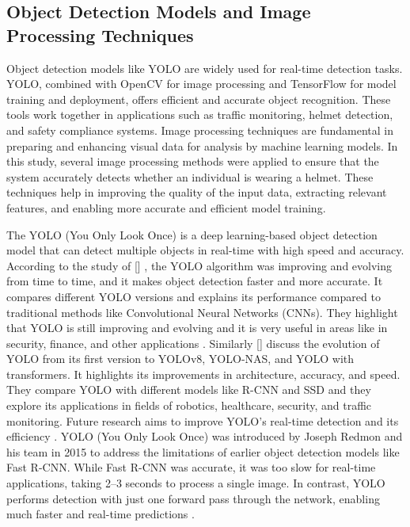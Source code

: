 \begin{refsection}
\subsection{Object Detection Models and Image Processing Techniques}

    Object detection models like YOLO are widely used for real-time detection tasks. YOLO, combined with OpenCV for image processing and TensorFlow for model training and deployment, offers efficient and accurate object recognition. These tools work together in applications such as traffic monitoring, helmet detection, and safety compliance systems.  Image processing techniques are fundamental in preparing and enhancing visual data for analysis by machine learning models. In this study, several image processing methods were applied to ensure that the system accurately detects whether an individual is wearing a helmet. These techniques help in improving the quality of the input data, extracting relevant features, and enabling more accurate and efficient model training.

The YOLO (You Only Look Once) is a deep learning-based object detection model that can detect multiple objects in real-time with high speed and accuracy. According to the study of \citeauthor{jiang2022review} [\citeyear{jiang2022review}] , the YOLO algorithm was improving and evolving from time to time, and it makes object detection faster and more accurate. It compares different YOLO versions and explains its performance compared to traditional methods like Convolutional Neural Networks (CNNs). They highlight that YOLO is still improving and evolving and it is very useful in areas like in security, finance, and other applications \cite{jiang2022review}. Similarly \citeauthor{terven2022comprehensive} [\citeyear{terven2022comprehensive}] discuss the evolution of YOLO from its first version to YOLOv8, YOLO-NAS, and YOLO with transformers. It highlights its improvements in architecture, accuracy, and speed. They compare YOLO with different models like R-CNN and SSD and they explore its applications in fields of robotics, healthcare, security, and traffic monitoring. Future research aims to improve YOLO’s real-time detection and its efficiency \cite{terven2022comprehensive}. YOLO (You Only Look Once) was introduced by Joseph Redmon and his team in 2015 to address the limitations of earlier object detection models like Fast R-CNN. While Fast R-CNN was accurate, it was too slow for real-time applications, taking 2–3 seconds to process a single image. In contrast, YOLO performs detection with just one forward pass through the network, enabling much faster and real-time predictions \cite{gfg2021yolo}.


\end{refsection}
